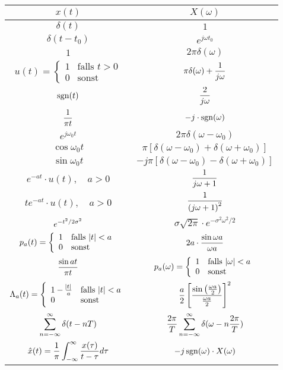 \documentclass[a4paper]{article}
\begin{document}
\begin{twocolumn}
\begin{tabular}{cc}
  $x(t)$ & $X(\omega)$ \\
  \toprule 
  $\delta(t)$ & $1$ \\
  $\delta(t-t_0)$ & $e^{j \omega t_0}$ \\
  $1$ & $2 \pi \delta(\omega)$ \\
  $u(t) = \left\{ \begin{array}{ll} 1 & \text{falls } t > 0 \\ 0 & \text{sonst} \end{array} \right.$ & $\displaystyle \pi \delta(\omega) + \frac{1}{j\omega}$ \\
  $\operatorname{sgn}(t)$ & $\displaystyle \frac{2}{j\omega}$ \\
  $\displaystyle \frac{1}{\pi t}$ & $-j \cdot \operatorname{sgn}(\omega)$ \\
  $e^{j \omega_0 t}$ & $2 \pi \delta(\omega - \omega_0)$ \\
  $\cos \omega_0 t$ & $\pi \left[ \delta(\omega - \omega_0) + \delta(\omega + \omega_0) \right]$ \\
  $\sin \omega_0 t$ & $-j \pi \left[ \delta(\omega - \omega_0) - \delta(\omega + \omega_0) \right]$ \\
  $e^{-a t} \cdot u(t), \quad a > 0$ & $\displaystyle \frac{1}{j \omega + 1}$ \\
  $t e^{-a t} \cdot u(t), \quad a > 0$ & $\displaystyle \frac{1}{\left( j \omega + 1 \right)^2}$ \\
  $\displaystyle e^{-t^2 / 2\sigma^2 }$ & $\sigma \sqrt{2\pi} \cdot e^{-\sigma^2 \omega^2 / 2}$ \\
  $p_a(t) = \left\{ \begin{array}{ll} 1 & \text{falls } \abs{t} < a \\ 0 & \text{sonst} \end{array} \right.$ & $\displaystyle 2a \cdot \frac{\sin \omega a}{\omega a}$ \\
  $\displaystyle \frac{\sin at}{\pi t}$ & $p_a(\omega) = \left\{ \begin{array}{ll} 1 & \text{falls } \abs{\omega} < a \\ 0 & \text{sonst} \end{array} \right.$ \\
  $\Lambda_a(t) = \left\{ \begin{array}{ll} 1 - \frac{\abs{t}}{a} & \text{falls } \abs{t} < a
  \\ 0 & \text{sonst} \end{array} \right.$ & $\displaystyle \frac{a}{2} \left[ \frac{\sin \left(\frac{\omega a}{2}\right)}{\frac{\omega a}{2}} \right]^2$ \\
  $\displaystyle \sum_{n = -\infty}^{\infty} \delta(t - nT)$ & $\displaystyle \frac{2\pi}{T} \sum_{n = -\infty}^{\infty} \delta(\omega - n \frac{2\pi}{T})$ \\
  $\displaystyle \hat{x}(t) = \frac{1}{\pi} \int_{-\infty}^\infty \frac{x(\tau)}{t - \tau}d \tau$ & $-j \operatorname{sgn}(\omega) \cdot X(\omega)$ \\
\end{tabular}


\end{twocolumn}
\end{document}
